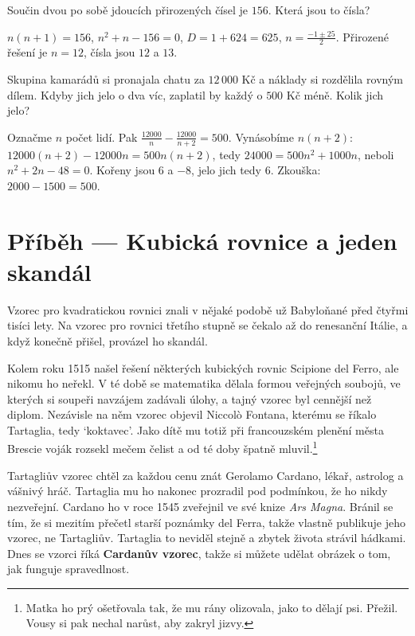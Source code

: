 \begin{problem}
  Součin dvou po sobě jdoucích přirozených čísel je $156$. Která jsou to čísla?
\end{problem}

\begin{solution}
  $n(n + 1) = 156$, $n^2 + n - 156 = 0$, $D = 1 + 624 = 625$, $n = \frac{-1\pm 25}{2}$. Přirozené řešení je $n = 12$, čísla jsou $12$ a $13$.
\end{solution}

\begin{problem}
  Skupina kamarádů si pronajala chatu za $12\,000$ Kč a náklady si rozdělila rovným dílem. Kdyby jich jelo o dva víc, zaplatil by každý o $500$ Kč méně. Kolik jich jelo?
\end{problem}

\begin{solution}
  Označme $n$ počet lidí. Pak $\frac{12000}{n} - \frac{12000}{n + 2} = 500$. Vynásobíme $n(n + 2)$: $12000(n + 2) - 12000n = 500n(n + 2)$, tedy $24000 = 500n^2 + 1000n$, neboli $n^2 + 2n - 48 = 0$. Kořeny jsou $6$ a $-8$, jelo jich tedy $6$. Zkouška: $2000 - 1500 = 500$.
\end{solution}

\section{Příběh --- Kubická rovnice a jeden skandál}

Vzorec pro kvadratickou rovnici znali v nějaké podobě už Babyloňané před čtyřmi tisíci lety. Na vzorec pro rovnici třetího stupně se čekalo až do renesanční Itálie, a když konečně přišel, provázel ho skandál.

Kolem roku 1515 našel řešení některých kubických rovnic Scipione del Ferro, ale nikomu ho neřekl. V té době se matematika dělala formou veřejných soubojů, ve kterých si soupeři navzájem zadávali úlohy, a tajný vzorec byl cennější než diplom. Nezávisle na něm vzorec objevil Niccolò Fontana, kterému se říkalo Tartaglia, tedy `koktavec'. Jako dítě mu totiž při francouzském plenění města Brescie voják rozsekl mečem čelist a od té doby špatně mluvil.\footnote{Matka ho prý ošetřovala tak, že mu rány olizovala, jako to dělají psi. Přežil. Vousy si pak nechal narůst, aby zakryl jizvy.}

Tartagliův vzorec chtěl za každou cenu znát Gerolamo Cardano, lékař, astrolog a vášnivý hráč. Tartaglia mu ho nakonec prozradil pod podmínkou, že ho nikdy nezveřejní. Cardano ho v roce 1545 zveřejnil ve své knize \textit{Ars Magna}. Bránil se tím, že si mezitím přečetl starší poznámky del Ferra, takže vlastně publikuje jeho vzorec, ne Tartagliův. Tartaglia to neviděl stejně a zbytek života strávil hádkami. Dnes se vzorci říká \textbf{Cardanův vzorec}, takže si můžete udělat obrázek o tom, jak funguje spravedlnost.

